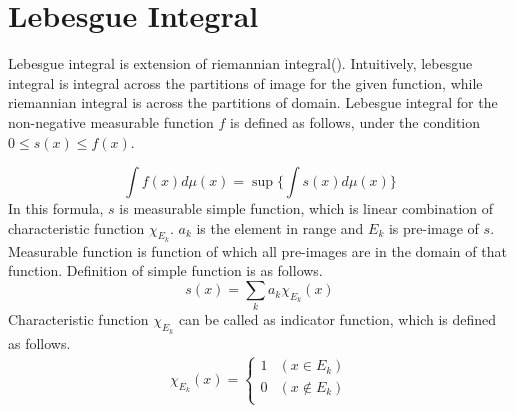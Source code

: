 \section{Lebesgue Integral}
Lebesgue integral is extension of riemannian integral(\cite{KwonY12}). 
Intuitively, lebesgue integral is integral across the partitions of image 
for the given function, while riemannian integral is across the partitions of domain. 
Lebesgue integral for the non-negative measurable function $f$ is defined as follows,
under the condition $0 \le s(x) \le f(x)$.

\begin{equation}
\label{APP_B_def:lebesgue_integral}
\int{f(x)  d\mu(x)} = \sup\{\int  s(x) d\mu(x)\}
\end{equation}
In this formula, $s$ is measurable simple function, which is linear combination of characteristic function $\chi_{E_k}$. 
$a_k$ is the element in range  and $E_k$ is pre-image of $s$.
Measurable function is function of which all pre-images are in the domain of that function.  
Definition of simple function is as follows.
\begin{equation}
\label{def:simple_function}
s(x) = \sum_k a_k \chi_{E_k}(x) 
\end{equation}
Characteristic function $\chi_{E_k}$ can be called as indicator function, which is defined as follows. 
\begin{align}
\label{def:charac_func}
\chi_{E_k}(x) = 
     \begin{cases}
       1 & (x \in E_k)\\
       0 & (x \notin E_k)\\
     \end{cases}
\end{align}